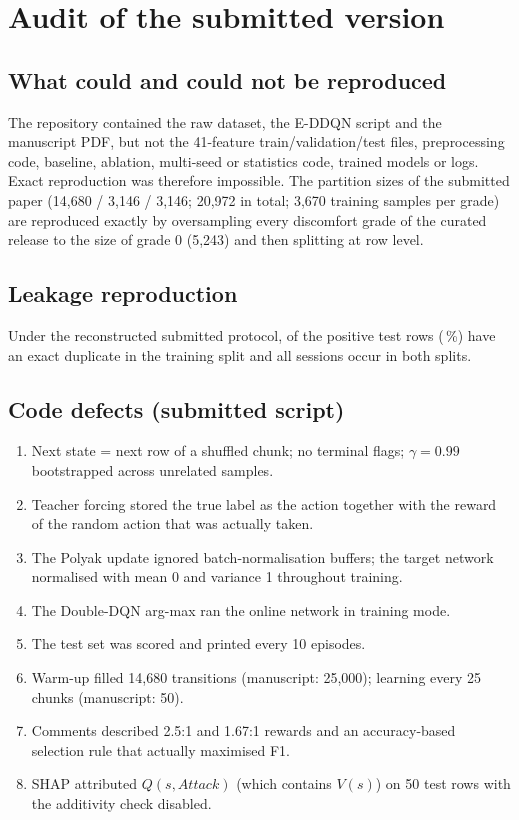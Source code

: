 \section{Audit of the submitted version}
\label{sec:s-audit}

\subsection{What could and could not be reproduced}
The repository contained the raw dataset, the E-DDQN script and the manuscript PDF, but not the 41-feature train/validation/test files, preprocessing code, baseline, ablation, multi-seed or statistics code, trained models or logs. Exact reproduction was therefore impossible. The partition sizes of the submitted paper (14,680 / 3,146 / 3,146; 20,972 in total; 3,670 training samples per grade) are reproduced exactly by oversampling every discomfort grade of the curated release to the size of grade 0 (5,243) and then splitting at row level.

\subsection{Leakage reproduction}
\noindent\resizebox{\textwidth}{!}{}

Under the reconstructed submitted protocol, \LeakDupPos{} of the \LeakTestPos{} positive test rows (\LeakDupPct\,\%) have an exact duplicate in the training split and all sessions occur in both splits.

\subsection{Code defects (submitted script)}
\begin{enumerate}
\item Next state = next row of a shuffled chunk; no terminal flags; $\gamma=0.99$ bootstrapped across unrelated samples.
\item Teacher forcing stored the true label as the action together with the reward of the random action that was actually taken.
\item The Polyak update ignored batch-normalisation buffers; the target network normalised with mean 0 and variance 1 throughout training.
\item The Double-DQN arg-max ran the online network in training mode.
\item The test set was scored and printed every 10 episodes.
\item Warm-up filled 14,680 transitions (manuscript: 25,000); learning every 25 chunks (manuscript: 50).
\item Comments described 2.5:1 and 1.67:1 rewards and an accuracy-based selection rule that actually maximised F1.
\item SHAP attributed $Q(s,\textit{Attack})$ (which contains $V(s)$) on 50 test rows with the additivity check disabled.
\end{enumerate}

